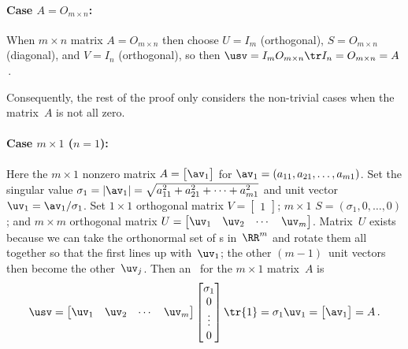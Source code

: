 \paragraph{Case $A=O_{m\times n}$:}
When \(m\times n\) matrix \(A=O_{m\times n}\) then choose \(U=I_m\) (orthogonal), \(S=O_{m\times n}\) (diagonal), and \(V=I_n\) (orthogonal), so then \(\usv=I_mO_{m\times n}\tr I_n=O_{m\times n}=A\)\,.  

Consequently, the rest of the proof only considers the non-trivial cases when the matrix~\(A\) is not all zero. 



\paragraph{Case $m\times 1$ ($n=1$):}
Here the \(m\times 1\) nonzero matrix \(A=\begin{bmatrix} \av_1 \end{bmatrix}\) for \(\av_1=(a_{11},a_{21},\ldots,a_{m1})\).
Set the singular value \(\sigma_1=|\av_1|=\sqrt{a_{11}^2+a_{21}^2+\cdots+a_{m1}^2}\) and unit vector \(\uv_1=\av_1/\sigma_1\).
Set \(1\times 1\) orthogonal matrix \(V=\begin{bmatrix} 1 \end{bmatrix}\);
\(m\times 1\)  
\(S=(\sigma_1,0,\ldots,0)\); and
\(m\times m\) orthogonal matrix \(U=\begin{bmatrix} \uv_1 &\uv_2&\cdots&\uv_m\end{bmatrix}\).
Matrix~\(U\) exists because we can take the orthonormal set of s in~\(\RR^m\) and rotate them all together so that the first lines up with~\(\uv_1\); the other \((m-1)\)~unit vectors then become the other~\(\uv_j\).
Then an \svd\ for the \(m\times1\) matrix~\(A\) is
\begin{equation*}
\usv
=\begin{bmatrix} \uv_1 &\uv_2&\cdots&\uv_m\end{bmatrix}
\begin{bmatrix} \sigma_1\\0\\\vdots\\0 \end{bmatrix}
\tr{1}
=\sigma_1{\uv_1}
=\begin{bmatrix} \av_1 \end{bmatrix}
=A\,.
\end{equation*}

